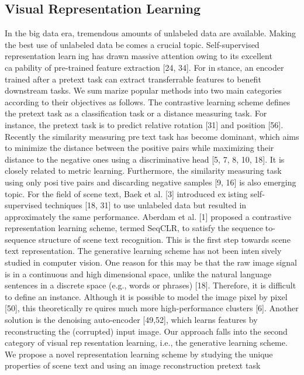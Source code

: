 \documentclass{article}
\begin{document}
\begin{multicols}{2}
\subsection{Visual Representation Learning}
In the big data era, tremendous amounts of unlabeled
data are available. Making the best use of unlabeled data becomes a crucial topic. Self-supervised representation learning has drawn massive attention owing to its excellent capability of pre-trained feature extraction [24, 34]. For instance, an encoder trained after a pretext task can extract
transferrable features to benefit downstream tasks. We summarize popular methods into two main categories according
to their objectives as follows.
The contrastive learning scheme defines the pretext
task as a classification task or a distance measuring task. For
instance, the pretext task is to predict relative rotation [31]
and position [56]. Recently the similarity measuring pretext task has become dominant, which aims to minimize
the distance between the positive pairs while maximizing
their distance to the negative ones using a discriminative
head [5, 7, 8, 10, 18]. It is closely related to metric learning.
Furthermore, the similarity measuring task using only positive pairs and discarding negative samples [9, 16] is also emerging topic.
For the field of scene text, Baek et al. [3] introduced existing self-supervised techniques [18, 31] to use unlabeled
data but resulted in approximately the same performance.
Aberdam et al. [1] proposed a contrastive representation
learning scheme, termed SeqCLR, to satisfy the sequenceto-sequence structure of scene text recognition. This is the
first step towards scene text representation.
The generative learning scheme has not been intensively studied in computer vision. One reason for this may
be that the raw image signal is in a continuous and highdimensional space, unlike the natural language sentences in
a discrete space (e.g., words or phrases) [18]. Therefore, it
is difficult to define an instance. Although it is possible to
model the image pixel by pixel [50], this theoretically requires much more high-performance clusters [6]. Another
solution is the denoising auto-encoder [49,52], which learns
features by reconstructing the (corrupted) input image.
Our approach falls into the second category of visual representation learning, i.e., the generative learning scheme.
We propose a novel representation learning scheme by
studying the unique properties of scene text and using an
image reconstruction pretext task
\pagebreak
\end{multicols}
\end{document}

